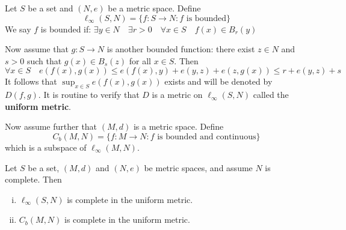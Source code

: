\documentclass[a4paper]{article}
\begin{document}
\begin{definition}
    Let $S$ be a set and $(N, e)$ be a metric space. Define
    \[
    \ell_{\infty}(S, N)=\{f: S \rightarrow N: f \text { is bounded}\}
    \]
    We say $f$ is bounded if: $\exists y \in N \quad \exists r>0 \quad \forall x \in S \quad f(x) \in B_r(y)$

    Now assume that $g: S \rightarrow N$ is another bounded function: there exist $z \in N$ and $s>0$ such that $g(x) \in B_s(z)$ for all $x \in S$. Then
    \[
    \forall x \in S \quad e(f(x), g(x)) \leqslant e(f(x), y)+e(y, z)+e(z, g(x)) \leqslant r+e(y, z)+s
    \]
    It follows that $\sup _{x \in S} e(f(x), g(x))$ exists and will be denoted by $D(f, g)$. It is routine to verify that $D$ is a metric on $\ell_{\infty}(S, N)$ called the \textbf{uniform metric}.

    Now assume further that $(M, d)$ is a metric space. Define
    \[
    C_b(M, N)=\{f: M \rightarrow N: f \text { is bounded and continuous}\}
    \]
    which is a subspace of $\ell_{\infty}(M, N)$.
\end{definition}

\begin{theorem}\label{thm:19}
    Let $S$ be a set, $(M, d)$ and $(N, e)$ be metric spaces, and assume $N$ is complete. Then
\begin{enumerate}[(i)]
    \item $\ell_{\infty}(S, N)$ is complete in the uniform metric.
    \item $C_b(M, N)$ is complete in the uniform metric.
\end{enumerate}
\end{theorem}
\end{document}
